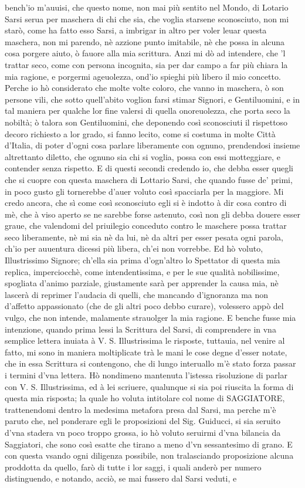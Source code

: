 \documentclass[11pt,twoside,openany]{book}
\begin{document}
bench'io m'auuisi, che questo nome, non mai più sentito nel Mondo, di Lotario Sarsi serua per maschera di chi che sia, che voglia starsene sconosciuto, non mi starò, come ha fatto esso Sarsi, a imbrigar in altro per voler leuar questa maschera, non mi parendo, nè azzione punto imitabile, nè che possa in alcuna cosa porgere aiuto, ò fauore alla mia scrittura. Anzi mi dò ad intendere, che 'l trattar seco, come con persona incognita, sia per dar campo a far più chiara la mia ragione, e porgermi ageuolezza, ond'io spieghi più libero il mio concetto. Perche io hò considerato che molte volte coloro, che vanno in maschera, ò son persone vili, che sotto quell'abito voglion farsi stimar Signori, e Gentiluomini, e in tal maniera per qualche lor fine valersi di quella onoreuolezza, che porta seco la nobiltà; ò talora son Gentiluomini, che deponendo così sconosciuti il rispettoso decoro richiesto a lor grado, si fanno lecito, come si costuma in molte Città d'Italia, di poter d'ogni cosa parlare liberamente con ognuno, prendendosi insieme altrettanto diletto, che ognuno sia chi si voglia, possa con essi motteggiare, e contender senza rispetto. E di questi secondi credendo io, che debba esser quegli che si cuopre con questa maschera di Lottario Sarsi, che quando fusse de' primi, in poco gusto gli tornerebbe d'auer voluto così spacciarla per la maggiore. Mi credo ancora, che sì come così sconosciuto egli si è indotto à dir cosa contro di mè, che à viso aperto se ne sarebbe forse astenuto, così non gli debba douere esser graue, che valendomi del priuilegio conceduto contro le maschere possa trattar seco liberamente, nè mi sia nè da lui, nè da altri per esser pesata ogni parola, ch'io per auuentura dicessi più libera, ch'ei non vorrebbe. Ed hò voluto, Illustrissimo Signore; ch'ella sia prima d'ogn'altro lo Spettator di questa mia replica, imperciocchè, come intendentissima, e per le sue qualità nobilissime, spogliata d'animo parziale, giustamente sarà per apprender la causa mia, nè lascerà di reprimer l'audacia di quelli, che mancando d'ignoranza ma non d'affetto appassionato (che de gli altri poco debbo curare), volessero appò del vulgo, che non intende, malamente strauolger la mia ragione. E benche fusse mia intenzione, quando prima lessi la Scrittura del Sarsi, di comprendere in vna semplice lettera inuiata à V. S. Illustrissima le risposte, tuttauia, nel venire al fatto, mi sono in maniera moltiplicate trà le mani le cose degne d'esser notate, che in essa Scrittura si contengono, che di lungo interuallo m'è stato forza passar i termini d'vna lettera. Hò nondimeno mantenuta l'istessa risoluzione di parlar con V. S. Illustrissima, ed à lei scriuere, qualunque si sia poi riuscita la forma di questa mia risposta; la quale ho voluta intitolare col nome di SAGGIATORE, trattenendomi dentro la medesima metafora presa dal Sarsi, ma perche m'è paruto che, nel ponderare egli le proposizioni del Sig. Guiducci, si sia seruito d'vna stadera vn poco troppo grossa, io hò voluto seruirmi d'vna bilancia da Saggiatori, che sono così esatte che tirano a meno d'vn sessantesimo di grano. E con questa vsando ogni diligenza possibile, non tralasciando proposizione alcuna proddotta da quello, farò di tutte i lor saggi, i quali anderò per numero distinguendo, e notando, acciò, se mai fussero dal Sarsi veduti, e 
\end{document}
